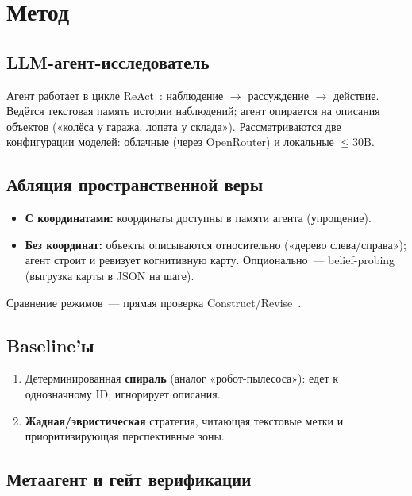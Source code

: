 \documentclass[11pt,a4paper]{article}
\begin{document}
\section{Метод}
\label{sec:method}

\subsection{LLM-агент-исследователь}

Агент работает в цикле ReAct~\cite{yao2022react}:
наблюдение \(\to\) рассуждение \(\to\) действие.
Ведётся текстовая память истории наблюдений; агент опирается на описания
объектов («колёса у гаража, лопата у склада»).
Рассматриваются две конфигурации моделей: облачные (через OpenRouter)
и локальные \(\le 30\mathrm{B}\).

\subsection{Абляция пространственной веры}

\begin{itemize}[leftmargin=*]
  \item \textbf{С координатами:} координаты доступны в памяти агента (упрощение).
  \item \textbf{Без координат:} объекты описываются относительно
        («дерево слева/справа»); агент строит и ревизует когнитивную карту.
        Опционально~--- belief-probing (выгрузка карты в JSON на шаге).
\end{itemize}
Сравнение режимов~--- прямая проверка Construct/Revise~\cite{theoryofspace2026}.

\subsection{Baseline'ы}

\begin{enumerate}[leftmargin=*]
  \item Детерминированная \textbf{спираль} (аналог «робот-пылесоса»): едет
        к однозначному ID, игнорирует описания.
  \item \textbf{Жадная/эвристическая} стратегия, читающая текстовые метки
        и приоритизирующая перспективные зоны.
\end{enumerate}

\subsection{Метаагент и гейт верификации}
\end{document}
